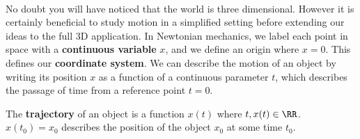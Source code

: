 \documentclass[../classical_mechanics.tex]{subfiles}
\begin{document}
        \paragraph{}
        No doubt you will have noticed that the world is three dimensional.
        However it is certainly beneficial to study motion in a simplified setting before extending our ideas to the full 3D application.
        In Newtonian mechanics, we label each point in space with a \textbf{continuous variable} $x$, and we define an origin where $x=0$.
        This defines our \textbf{coordinate system}.
        We can describe the motion of an object by writing its position $x$ as a function of a continuous parameter $t$, which describes the passage of time from a reference point $t=0$.
        \begin{definition}
            The \textbf{trajectory} of an object is a function $x(t)$ where $t,x(t)\in\RR$. $x(t_0)=x_0$ describes the position of the object $x_0$ at some time $t_0$.
        \end{definition}
\end{document}
